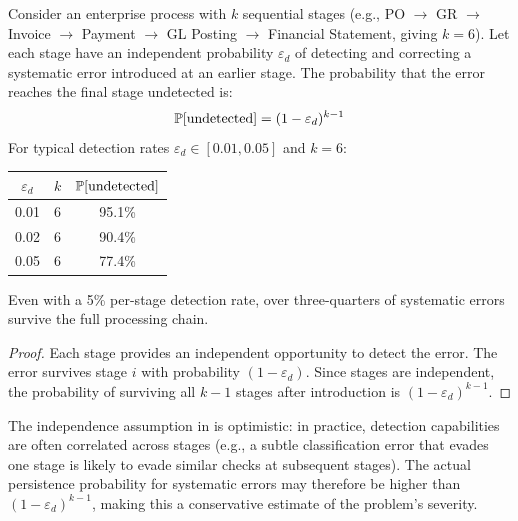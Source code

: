 \begin{proposition}
\label{prop:error_persistence}
Consider an enterprise process with $k$ sequential stages
(e.g., PO $\to$ GR $\to$ Invoice $\to$ Payment $\to$ GL Posting
$\to$ Financial Statement, giving $k = 6$).  Let each stage have
an independent probability $\varepsilon_d$ of detecting and correcting a
systematic error introduced at an earlier stage.  The probability that
the error reaches the final stage undetected is:
\begin{equation}
\mathbb{P}[\text{undetected}] = (1 - \varepsilon_d)^{k-1}
\label{eq:error_persistence}
\end{equation}
For typical detection rates $\varepsilon_d \in [0.01, 0.05]$ and $k = 6$:
\begin{center}
\begin{tabular}{ccc}
\toprule
$\varepsilon_d$ & $k$ & $\mathbb{P}[\text{undetected}]$ \\
\midrule
0.01 & 6 & 95.1\% \\
0.02 & 6 & 90.4\% \\
0.05 & 6 & 77.4\% \\
\bottomrule
\end{tabular}
\end{center}
Even with a 5\% per-stage detection rate, over three-quarters of
systematic errors survive the full processing chain.
\end{proposition}

\begin{proof}
Each stage provides an independent opportunity to detect the error.
The error survives stage $i$ with probability $(1 - \varepsilon_d)$.
Since stages are independent, the probability of surviving all $k-1$
stages after introduction is $(1 - \varepsilon_d)^{k-1}$.
\end{proof}

\begin{remark}
The independence assumption in  is
optimistic: in practice, detection capabilities are often correlated
across stages (e.g., a subtle classification error that evades one
stage is likely to evade similar checks at subsequent stages).  The
actual persistence probability for systematic errors may therefore
be higher than $(1 - \varepsilon_d)^{k-1}$, making this a conservative
estimate of the problem's severity.
\end{remark}

